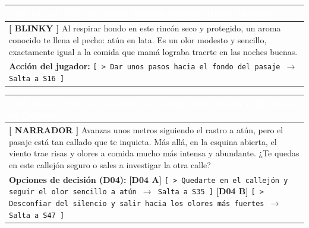 \documentclass[11pt, a4paper]{article}
\begin{document}
\vspace{1em}

\noindent
\begin{tabularx}{\textwidth}{|X|}
\hline
\rowcolor{colorHeader}
\textbf{\textcolor{white}{PANTALLA S15 $\cdot$ El Aroma Familiar}} \hfill \small\textcolor{white}{Sentido: Olfato Modesto} \\ \hline
\rowcolor{colorTextoBox}
\textbf{\textcolor{colorEmisor}{[ BLINKY ]}} \vspace{0.2em}\newline
Al respirar hondo en este rincón seco y protegido, un aroma conocido te llena el pecho: atún en lata. Es un olor modesto y sencillo, exactamente igual a la comida que mamá lograba traerte en las noches buenas. \\ \hline
\rowcolor{colorBotonBox}
\textbf{Acción del jugador:} \newline
\texttt{[ > Dar unos pasos hacia el fondo del pasaje $\rightarrow$ Salta a S16 ]} \\ \hline
\end{tabularx}

\vspace{1em}

\noindent
\begin{tabularx}{\textwidth}{|X|}
\hline
\rowcolor{colorDecision}
\textbf{\textcolor{white}{PANTALLA S16 $\cdot$ La Quietud del Callejón [DECISIÓN D04]}} \hfill \small\textcolor{white}{Dilema de Paciencia} \\ \hline
\rowcolor{colorTextoBox}
\textbf{\textcolor{colorEmisor}{[ NARRADOR ]}} \vspace{0.2em}\newline
Avanzas unos metros siguiendo el rastro a atún, pero el pasaje está tan callado que te inquieta. Más allá, en la esquina abierta, el viento trae risas y olores a comida mucho más intensa y abundante. ¿Te quedas en este callejón seguro o sales a investigar la otra calle? \\ \hline
\rowcolor{colorBotonBox}
\textbf{Opciones de decisión (D04):} \newline
\textbf{[D04 A]} {\small\texttt{[ > Quedarte en el callejón y seguir el olor sencillo a atún $\rightarrow$ Salta a S35 ]}} \vspace{0.3em}\newline
\textbf{[D04 B]} {\small\texttt{[ > Desconfiar del silencio y salir hacia los olores más fuertes $\rightarrow$ Salta a S47 ]}} \\ \hline
\end{tabularx}
\end{document}
